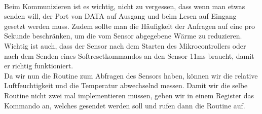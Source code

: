 \documentclass[]{article}
\begin{document}
\\Beim Kommunizieren ist es wichtig, nicht zu vergessen, dass wenn man etwas senden will, der Port von DATA auf Ausgang und beim Lesen auf Eingang gesetzt werden muss. Zudem sollte man die Häufigkeit der Anfragen auf eine pro Sekunde beschränken, um die vom Sensor abgegebene Wärme zu reduzieren.
\\Wichtig ist auch, dass der Sensor nach dem Starten des Mikrocontrollers oder nach dem Senden eines Softresetkommandos an den Sensor 11ms braucht, damit er richtig funktioniert.
\\Da wir nun die Routine zum Abfragen des Sensors haben, können wir die relative Luftfeuchtigkeit und die Temperatur abwechselnd messen. Damit wir die selbe Routine nicht zwei mal implementieren müssen, geben wir in einem Register das Kommando an, welches gesendet werden soll und rufen dann die Routine auf.
\end{document}
